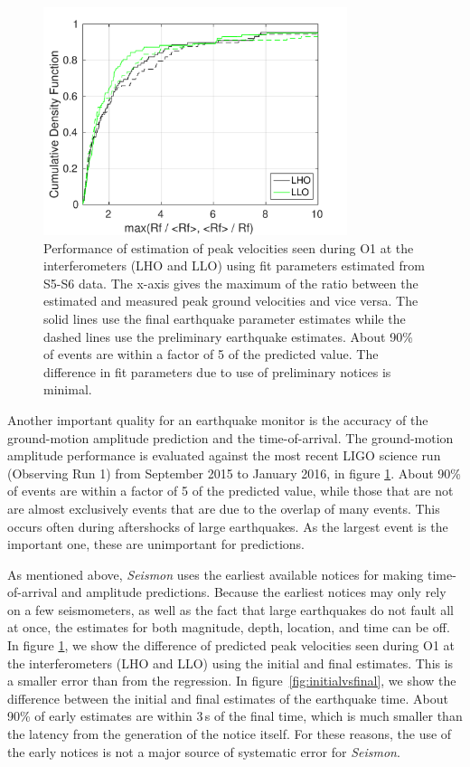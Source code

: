 \documentclass[twocolumn, aps, superscriptaddress]{revtex4}
\begin{document}
\begin{figure}[t]
\hspace*{-0.5cm}
 \includegraphics[width=3.5in]{initial_final_vs_real.pdf}
 \caption{Performance of estimation of peak velocities seen during O1 at the interferometers (LHO and LLO) using fit parameters estimated from S5-S6 data. The x-axis gives the maximum of the ratio between the estimated and measured peak ground velocities and vice versa. The solid lines use the final earthquake parameter estimates while the dashed lines use the preliminary earthquake estimates. About 90\% of events are within a factor of 5 of the predicted value. The difference in fit parameters due to use of preliminary notices is minimal.}
 \label{fig:regressionperf}
\end{figure}

Another important quality for an earthquake monitor is the accuracy of the ground-motion amplitude prediction and the time-of-arrival.
The ground-motion amplitude performance is evaluated against the most recent LIGO science run (Observing Run 1) from September 2015 to January 2016, in figure \ref{fig:regressionperf}. About 90\% of events are within a factor of 5 of the predicted value, while those that are not are almost exclusively events that are due to the overlap of many events. This occurs often during aftershocks of large earthquakes. As the largest event is the important one, these are unimportant for predictions. 

As mentioned above, \emph{Seismon} uses the earliest available notices for making time-of-arrival and amplitude predictions. Because the earliest notices may only rely on a few seismometers, as well as the fact that large earthquakes do not fault all at once, the estimates for both magnitude, depth, location, and time can be off. In figure \ref{fig:regressionperf}, we show the difference of predicted peak velocities seen during O1 at the interferometers (LHO and LLO) using the initial and final estimates. This is a smaller error than from the regression. 
In figure~\ref{fig:initialvsfinal}, we show the difference between the initial and final estimates of the earthquake time. About 90\% of early estimates are within 3\,s of the final time, which is much smaller than the latency from the generation of the notice itself.
For these reasons, the use of the early notices is not a major source of systematic error for \emph{Seismon}.
\end{document}
